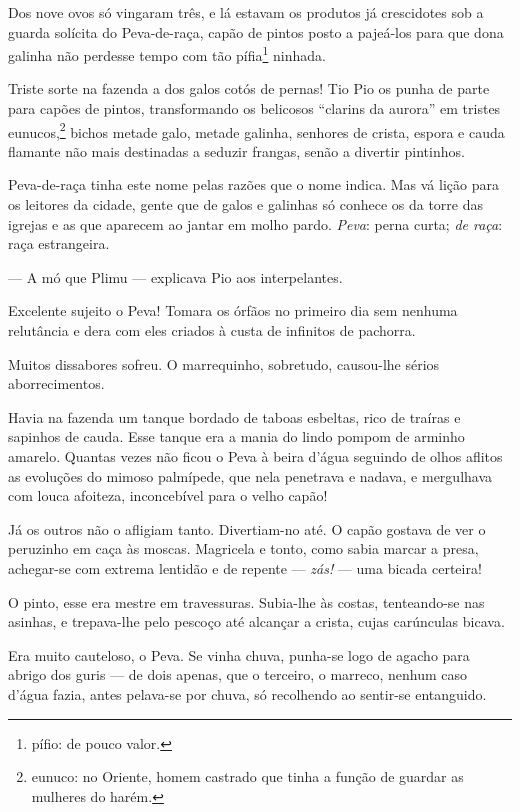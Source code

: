 Dos nove ovos só vingaram três, e lá estavam os produtos já crescidotes
sob a guarda solícita do Peva-de-raça, capão de pintos posto a pajeá-los
para que dona galinha não perdesse tempo com tão pífia\footnote{pífio:
  de pouco valor.} ninhada.

Triste sorte na fazenda a dos galos cotós de pernas! Tio Pio os punha de
parte para capões de pintos, transformando os belicosos ``clarins da
aurora'' em tristes eunucos,\footnote{eunuco: no Oriente, homem castrado
  que tinha a função de guardar as mulheres do harém.} bichos metade
galo, metade galinha, senhores de crista, espora e cauda flamante não
mais destinadas a seduzir frangas, senão a divertir pintinhos.

Peva-de-raça tinha este nome pelas razões que o nome indica. Mas vá
lição para os leitores da cidade, gente que de galos e galinhas só
conhece os da torre das igrejas e as que aparecem ao jantar em molho
pardo. \emph{Peva}: perna curta; \emph{de raça}: raça estrangeira.

--- A mó que Plimu --- explicava Pio aos interpelantes.

Excelente sujeito o Peva! Tomara os órfãos no primeiro dia sem nenhuma
relutância e dera com eles criados à custa de infinitos de pachorra.

Muitos dissabores sofreu. O marrequinho, sobretudo, causou-lhe sérios
aborrecimentos.

Havia na fazenda um tanque bordado de taboas esbeltas, rico de traíras e
sapinhos de cauda. Esse tanque era a mania do lindo pompom de arminho
amarelo. Quantas vezes não ficou o Peva à beira d'água seguindo de olhos
aflitos as evoluções do mimoso palmípede, que nela penetrava e nadava, e
mergulhava com louca afoiteza, inconcebível para o velho capão!

Já os outros não o afligiam tanto. Divertiam-no até. O capão gostava de
ver o peruzinho em caça às moscas. Magricela e tonto, como sabia marcar
a presa, achegar-se com extrema lentidão e de repente --- \emph{zás!}
--- uma bicada certeira!

O pinto, esse era mestre em travessuras. Subia-lhe às costas,
tenteando-se nas asinhas, e trepava-lhe pelo pescoço até alcançar a
crista, cujas carúnculas bicava.

Era muito cauteloso, o Peva. Se vinha chuva, punha-se logo de agacho
para abrigo dos guris --- de dois apenas, que o terceiro, o marreco,
nenhum caso d'água fazia, antes pelava-se por chuva, só recolhendo ao
sentir-se entanguido.


